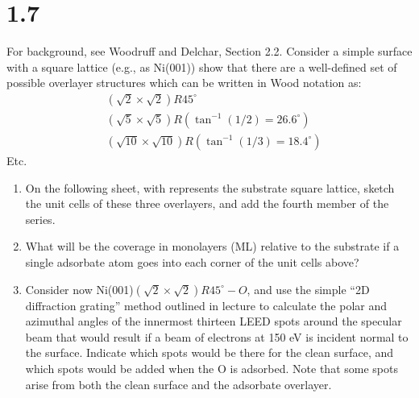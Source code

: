 \documentclass[12pt]{article}
\renewcommand{\=}[1]{\stackrel{#1}{=}} %
\theoremstyle{definition}
\theoremstyle{remark}
\begin{document}
\newpage
\section*{1.7}
\begin{bclogo}[logo=\bcquestion , barre=none]
\newline
 For background, see Woodruff and Delchar, Section 2.2.
 \newline
Consider a simple surface with a square lattice (e.g., as Ni(001)) show that there are a well-defined set
of possible overlayer structures which can be written in Wood notation as:
\begin{align*}
&\left(\sqrt{2}\times\sqrt{2}\right)R45^\circ\\
&\left(\sqrt{5}\times\sqrt{5}\right)R(\tan^{-1}(1/2)=26.6^\circ)\\
&\left(\sqrt{10}\times\sqrt{10}\right)R(\tan^{-1}(1/3)=18.4^\circ)
\end{align*}
\center Etc.
\newline
\begin{enumerate}
\item On the following sheet, with represents the substrate square lattice, sketch the unit cells of these three overlayers, and add the fourth member of the series. 
\item What will be the coverage in monolayers (ML) relative to the substrate if a single adsorbate atom goes into each corner of the unit cells above? 
\item Consider now Ni(001)$\left(\sqrt{2}\times\sqrt{2}\right)R45^\circ-O$, and use the simple “2D diffraction grating” method
outlined in lecture to calculate the polar and azimuthal angles of the innermost thirteen LEED spots around the specular beam that would result if a beam of electrons at 150 eV is incident normal to the surface. Indicate which spots would be there for the clean surface, and which spots would be added when the O is adsorbed. Note that some spots arise from both the clean surface and the adsorbate overlayer.
\end{enumerate}
\end{bclogo}
\vspace{2cm}






\end{document}
